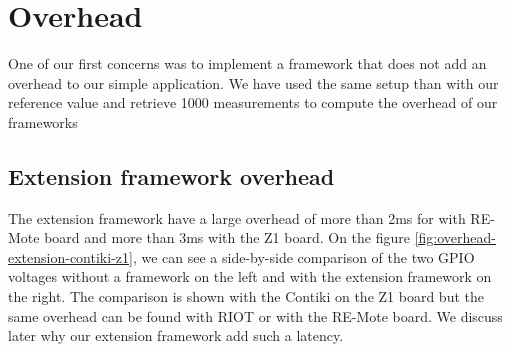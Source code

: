 \section{Overhead}

One of our first concerns was to implement a framework that does not add an overhead to our simple application.
We have used the same setup than with our reference value and retrieve 1000 measurements to compute the overhead of our frameworks

\subsection{Extension framework overhead}

The extension framework have a large overhead of more than 2ms for with RE-Mote board and more than 3ms with the Z1 board.
On the figure \ref{fig:overhead-extension-contiki-z1}, we can see a side-by-side comparison of the two GPIO voltages without a framework on the left and with the extension framework on the right.
The comparison is shown with the Contiki on the Z1 board but the same overhead can be found with RIOT or with the RE-Mote board.
We discuss later why our extension framework add such a latency.


